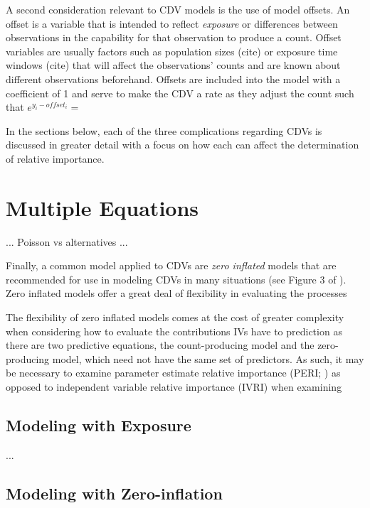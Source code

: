 \documentclass[ShortAfour,times,sageapa]{sagej}
\begin{document}
	
	A second consideration relevant to CDV models is the use of model offsets.  An offset is a variable that is intended to reflect \emph{exposure} or differences between observations in the capability for that observation to produce a count.  Offset variables are usually factors such as population sizes (cite) or exposure time windows (cite) that will affect the observations' counts and are known about different observations beforehand.  Offsets are included into the model with a coefficient of 1 and serve to make the CDV a rate as they adjust the count such that $e^{y_{i} - offset_{i}} = $
	
	
	
	In the sections below, each of the three complications regarding CDVs is discussed in greater detail with a focus on how each can affect the determination of relative importance.
	
\section{Multiple Equations}
	
	... Poisson vs alternatives ...
		
	Finally, a common model applied to CDVs are \emph{zero inflated} models that are recommended for use in modeling CDVs in many situations (see Figure 3 of \cite{blevins2015count}).  Zero inflated models offer a great deal of flexibility in evaluating the processes
	
	The flexibility of zero inflated models comes at the cost of greater complexity when considering how to evaluate the contributions IVs have to prediction as there are two predictive equations, the count-producing model and the zero-producing model, which need not have the same set of predictors.  As such, it may be necessary to examine parameter estimate relative importance (PERI; \cite{luchman2020relative}) as opposed to independent variable relative importance (IVRI) when examining 

	\subsection{Modeling with Exposure}
	
	...
	
	\subsection{Modeling with Zero-inflation}
	
\end{document}

